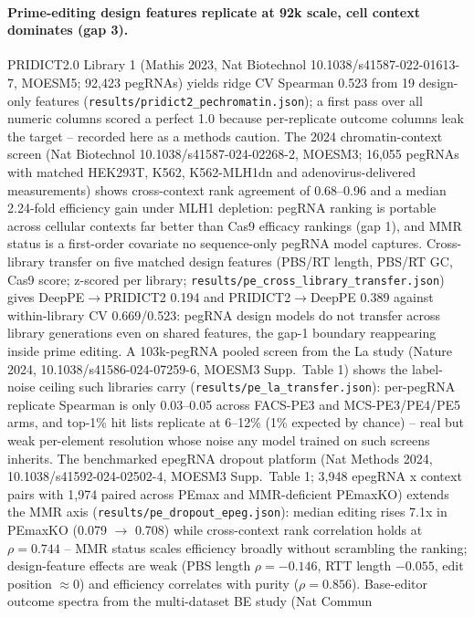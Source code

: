 \documentclass[12pt]{article}
\begin{document}
\paragraph{Prime-editing design features replicate at 92k scale, cell
context dominates (gap 3).} PRIDICT2.0 Library 1 (Mathis 2023, Nat
Biotechnol 10.1038/s41587-022-01613-7, MOESM5; 92,423 pegRNAs) yields
ridge CV Spearman 0.523 from 19 design-only features
(\texttt{results/pridict2\_pechromatin.json}); a first pass over all
numeric columns scored a perfect 1.0 because per-replicate outcome
columns leak the target -- recorded here as a methods caution. The 2024
chromatin-context screen (Nat Biotechnol
10.1038/s41587-024-02268-2, MOESM3; 16,055 pegRNAs with matched HEK293T,
K562, K562-MLH1dn and adenovirus-delivered measurements) shows
cross-context rank agreement of 0.68--0.96 and a median 2.24-fold
efficiency gain under MLH1 depletion: pegRNA ranking is portable across
cellular contexts far better than Cas9 efficacy rankings (gap 1), and
MMR status is a first-order covariate no sequence-only pegRNA model
captures.
Cross-library transfer on five matched design features (PBS/RT length,
PBS/RT GC, Cas9 score; z-scored per library;
\texttt{results/pe\_cross\_library\_transfer.json}) gives
DeepPE$\to$PRIDICT2 0.194 and PRIDICT2$\to$DeepPE 0.389 against
within-library CV 0.669/0.523: pegRNA design models do not transfer
across library generations even on shared features, the gap-1 boundary
reappearing inside prime editing. A 103k-pegRNA pooled screen from the La
study (Nature 2024, 10.1038/s41586-024-07259-6, MOESM3 Supp.\ Table 1)
shows the label-noise ceiling such libraries carry
(\texttt{results/pe\_la\_transfer.json}): per-pegRNA replicate Spearman
is only 0.03--0.05 across FACS-PE3 and MCS-PE3/PE4/PE5 arms, and top-1\%
hit lists replicate at 6--12\% (1\% expected by chance) -- real but
weak per-element resolution whose noise any model trained on such
screens inherits.
The benchmarked epegRNA dropout platform (Nat Methods 2024,
10.1038/s41592-024-02502-4, MOESM3 Supp.\ Table 1; 3,948 epegRNA x
context pairs with 1,974 paired across PEmax and MMR-deficient PEmaxKO)
extends the MMR axis (\texttt{results/pe\_dropout\_epeg.json}): median
editing rises 7.1x in PEmaxKO (0.079 $\to$ 0.708) while cross-context
rank correlation holds at $\rho=0.744$ -- MMR status scales efficiency
broadly without scrambling the ranking; design-feature effects are weak
(PBS length $\rho=-0.146$, RTT length $-0.055$, edit position $\approx
0$) and efficiency correlates with purity ($\rho=0.856$).
Base-editor outcome spectra from the multi-dataset BE study (Nat Commun
\end{document}
